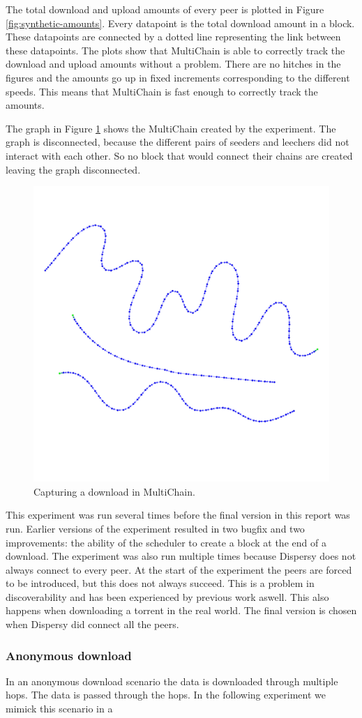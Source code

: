 The total download and upload amounts of every peer is plotted in Figure \ref{fig:synthetic-amounts}.
Every datapoint is the total download amount in a block.
These datapoints are connected by a dotted line representing the link between these datapoints.
The plots show that MultiChain is able to correctly track the download and upload amounts without a problem.
There are no hitches in the figures and the amounts go up in fixed increments corresponding to the different speeds.
This means that MultiChain is fast enough to correctly track the amounts.



The graph in Figure \ref{fig:synthetic-graph} shows the MultiChain created by the experiment.
The graph is disconnected, because the different pairs of seeders and leechers did not interact with each other.
So no block that would connect their chains are created leaving the graph disconnected.

\begin{figure}
	\centerline{\includegraphics[scale=0.06]{experimentation/synthetic/synthetic.png}}
	\caption{Capturing a download in MultiChain.}
	\label{fig:synthetic-graph}
\end{figure}

This experiment was run several times before the final version in this report was run.
Earlier versions of the experiment resulted in two bugfix and two improvements:
the ability of the scheduler to create a block at the end of a download.
The experiment was also run multiple times because Dispersy does not always connect to every peer.
At the start of the experiment the peers are forced to be introduced,
but this does not always succeed.
This is a problem in discoverability and has been experienced by previous work aswell\cite{ruigrok-anonymous}.
This also happens when downloading a torrent in the real world.
The final version is chosen when Dispersy did connect all the peers.

\subsubsection{Anonymous download}
In an anonymous download scenario the data is downloaded through multiple hops.
The data is passed through the hops.
In the following experiment we mimick this scenario in a 


